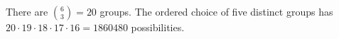 There are $\binom63=20$ groups. The ordered choice of five distinct groups has $20\cdot19\cdot18\cdot17\cdot16=\boxed{1860480}$ possibilities.
